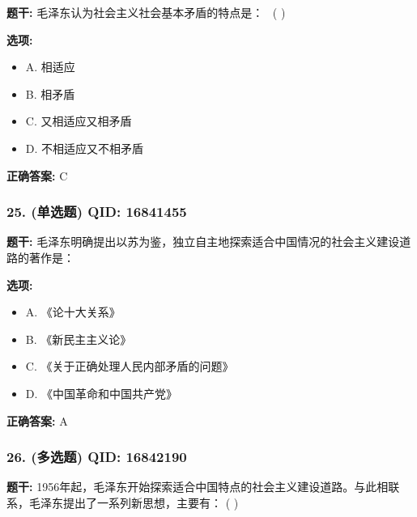 \documentclass[12pt,UTF8]{ctexart}
\begin{document}
\textbf{题干:}
毛泽东认为社会主义社会基本矛盾的特点是：  ( )

\textbf{选项:}
\begin{itemize}[leftmargin=*]

  \item A. 相适应

  \item B. 相矛盾

  \item C. 又相适应又相矛盾

  \item D. 不相适应又不相矛盾

\end{itemize}

\textbf{正确答案:}
C

\vspace{0.3em}\hrulefill\vspace{0.7em}

\subsubsection*{25. (单选题) \small QID: 16841455}

\textbf{题干:}
毛泽东明确提出以苏为鉴，独立自主地探索适合中国情况的社会主义建设道路的著作是：

\textbf{选项:}
\begin{itemize}[leftmargin=*]

  \item A. 《论十大关系》

  \item B. 《新民主主义论》

  \item C. 《关于正确处理人民内部矛盾的问题》

  \item D. 《中国革命和中国共产党》

\end{itemize}

\textbf{正确答案:}
A

\vspace{0.3em}\hrulefill\vspace{0.7em}

\subsubsection*{26. (多选题) \small QID: 16842190}

\textbf{题干:}
1956年起，毛泽东开始探索适合中国特点的社会主义建设道路。与此相联系，毛泽东提出了一系列新思想，主要有： ( )
\end{document}
